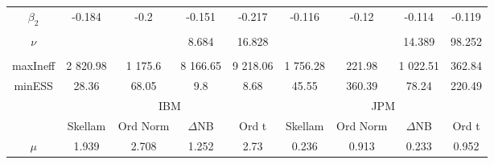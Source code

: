 \begin{footnotesize}
\begin{singlespace}
\begin{tabular}{ccccccccc}
$ \beta_{2} $ & -0.184 & -0.2 & -0.151 & -0.217 & -0.116 & -0.12 & -0.114 & -0.119 \\ 
 & \begin{tiny} [-0.272,-0.097] \end{tiny}  & \begin{tiny} [-0.292,-0.109] \end{tiny}  & \begin{tiny} [-0.236,-0.07] \end{tiny}  & \begin{tiny} [-0.32,-0.116] \end{tiny}  & \begin{tiny} [-0.221,-0.008] \end{tiny}  & \begin{tiny} [-0.209,-0.033] \end{tiny}  & \begin{tiny} [-0.223,-0.005] \end{tiny}  & \begin{tiny} [-0.204,-0.03] \end{tiny}  \\ 
$\nu$ &  &  & 8.684 & 16.828 &  &  & 14.389 & 98.252 \\ 
 &  &  & \begin{tiny} [6.4,11.2] \end{tiny}  & \begin{tiny} [10.8,24.2] \end{tiny}  &  &  & \begin{tiny} [10.4,18.2] \end{tiny}  & \begin{tiny} [60.4, 128] \end{tiny}  \\  \midrule 
maxIneff & 2 820.98 & 1 175.6 & 8 166.65 & 9 218.06 & 1 756.28 &  221.98 & 1 022.51 &  362.84 \\ 
minESS & 28.36 & 68.05 & 9.8 & 8.68 & 45.55 &  360.39 & 78.24 &  220.49 \\ \midrule 
 & \multicolumn{4}{c}{IBM}& \multicolumn{4}{c}{JPM} \\ 
\cmidrule(r){2-5} \cmidrule(r){6-9} &  \multicolumn{1}{c}{Skellam}&  \multicolumn{1}{c}{Ord Norm}&  \multicolumn{1}{c}{$\Delta$NB}&  \multicolumn{1}{c}{Ord t}&  \multicolumn{1}{c}{Skellam}&  \multicolumn{1}{c}{Ord Norm}&  \multicolumn{1}{c}{$\Delta$NB}&  \multicolumn{1}{c}{Ord t} \\ \midrule 
 $ \mu $ & 1.939 & 2.708 & 1.252 & 2.73 & 0.236 & 0.913 & 0.233 & 0.952 \\ 

\end{tabular}
\end{singlespace}
\end{footnotesize}
